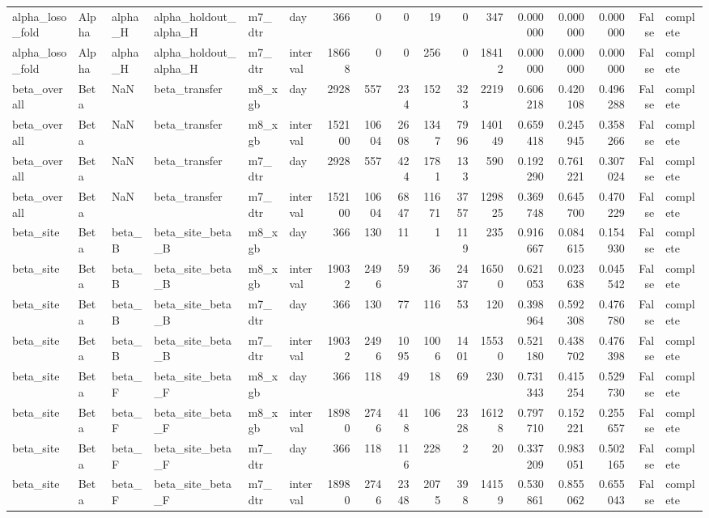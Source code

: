 \begin{tabular}{llllllrrrrrrrrrrl}
alpha_loso_fold & Alpha & alpha_H & alpha_holdout_alpha_H & m7_dtr & day & 366 & 0 & 0 & 19 & 0 & 347 & 0.000000 & 0.000000 & 0.000000 & False & complete \\
alpha_loso_fold & Alpha & alpha_H & alpha_holdout_alpha_H & m7_dtr & interval & 18668 & 0 & 0 & 256 & 0 & 18412 & 0.000000 & 0.000000 & 0.000000 & False & complete \\
beta_overall & Beta & NaN & beta_transfer & m8_xgb & day & 2928 & 557 & 234 & 152 & 323 & 2219 & 0.606218 & 0.420108 & 0.496288 & False & complete \\
beta_overall & Beta & NaN & beta_transfer & m8_xgb & interval & 152100 & 10604 & 2608 & 1347 & 7996 & 140149 & 0.659418 & 0.245945 & 0.358266 & False & complete \\
beta_overall & Beta & NaN & beta_transfer & m7_dtr & day & 2928 & 557 & 424 & 1781 & 133 & 590 & 0.192290 & 0.761221 & 0.307024 & False & complete \\
beta_overall & Beta & NaN & beta_transfer & m7_dtr & interval & 152100 & 10604 & 6847 & 11671 & 3757 & 129825 & 0.369748 & 0.645700 & 0.470229 & False & complete \\
beta_site & Beta & beta_B & beta_site_beta_B & m8_xgb & day & 366 & 130 & 11 & 1 & 119 & 235 & 0.916667 & 0.084615 & 0.154930 & False & complete \\
beta_site & Beta & beta_B & beta_site_beta_B & m8_xgb & interval & 19032 & 2496 & 59 & 36 & 2437 & 16500 & 0.621053 & 0.023638 & 0.045542 & False & complete \\
beta_site & Beta & beta_B & beta_site_beta_B & m7_dtr & day & 366 & 130 & 77 & 116 & 53 & 120 & 0.398964 & 0.592308 & 0.476780 & False & complete \\
beta_site & Beta & beta_B & beta_site_beta_B & m7_dtr & interval & 19032 & 2496 & 1095 & 1006 & 1401 & 15530 & 0.521180 & 0.438702 & 0.476398 & False & complete \\
beta_site & Beta & beta_F & beta_site_beta_F & m8_xgb & day & 366 & 118 & 49 & 18 & 69 & 230 & 0.731343 & 0.415254 & 0.529730 & False & complete \\
beta_site & Beta & beta_F & beta_site_beta_F & m8_xgb & interval & 18980 & 2746 & 418 & 106 & 2328 & 16128 & 0.797710 & 0.152221 & 0.255657 & False & complete \\
beta_site & Beta & beta_F & beta_site_beta_F & m7_dtr & day & 366 & 118 & 116 & 228 & 2 & 20 & 0.337209 & 0.983051 & 0.502165 & False & complete \\
beta_site & Beta & beta_F & beta_site_beta_F & m7_dtr & interval & 18980 & 2746 & 2348 & 2075 & 398 & 14159 & 0.530861 & 0.855062 & 0.655043 & False & complete \\

\end{tabular}
